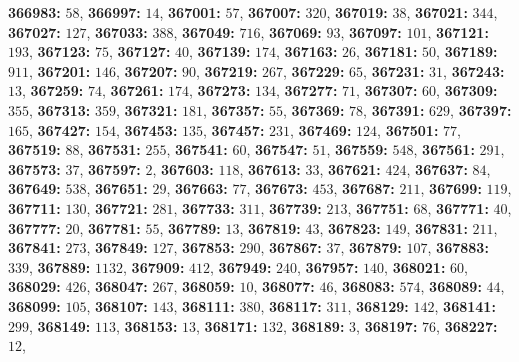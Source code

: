 \textsf{\bfseries 366983:} $58$, \textsf{\bfseries 366997:} $14$, \textsf{\bfseries 367001:} $57$, \textsf{\bfseries 367007:} $320$, \textsf{\bfseries 367019:} $38$, \textsf{\bfseries 367021:} $344$, \textsf{\bfseries 367027:} $127$, \textsf{\bfseries 367033:} $388$, \textsf{\bfseries 367049:} $716$, \textsf{\bfseries 367069:} $93$, \textsf{\bfseries 367097:} $101$, \textsf{\bfseries 367121:} $193$, \textsf{\bfseries 367123:} $75$, \textsf{\bfseries 367127:} $40$, \textsf{\bfseries 367139:} $174$, \textsf{\bfseries 367163:} $26$, \textsf{\bfseries 367181:} $50$, \textsf{\bfseries 367189:} $911$, \textsf{\bfseries 367201:} $146$, \textsf{\bfseries 367207:} $90$, \textsf{\bfseries 367219:} $267$, \textsf{\bfseries 367229:} $65$, \textsf{\bfseries 367231:} $31$, \textsf{\bfseries 367243:} $13$, \textsf{\bfseries 367259:} $74$, \textsf{\bfseries 367261:} $174$, \textsf{\bfseries 367273:} $134$, \textsf{\bfseries 367277:} $71$, \textsf{\bfseries 367307:} $60$, \textsf{\bfseries 367309:} $355$, \textsf{\bfseries 367313:} $359$, \textsf{\bfseries 367321:} $181$, \textsf{\bfseries 367357:} $55$, \textsf{\bfseries 367369:} $78$, \textsf{\bfseries 367391:} $629$, \textsf{\bfseries 367397:} $165$, \textsf{\bfseries 367427:} $154$, \textsf{\bfseries 367453:} $135$, \textsf{\bfseries 367457:} $231$, \textsf{\bfseries 367469:} $124$, \textsf{\bfseries 367501:} $77$, \textsf{\bfseries 367519:} $88$, \textsf{\bfseries 367531:} $255$, \textsf{\bfseries 367541:} $60$, \textsf{\bfseries 367547:} $51$, \textsf{\bfseries 367559:} $548$, \textsf{\bfseries 367561:} $291$, \textsf{\bfseries 367573:} $37$, \textsf{\bfseries 367597:} $2$, \textsf{\bfseries 367603:} $118$, \textsf{\bfseries 367613:} $33$, \textsf{\bfseries 367621:} $424$, \textsf{\bfseries 367637:} $84$, \textsf{\bfseries 367649:} $538$, \textsf{\bfseries 367651:} $29$, \textsf{\bfseries 367663:} $77$, \textsf{\bfseries 367673:} $453$, \textsf{\bfseries 367687:} $211$, \textsf{\bfseries 367699:} $119$, \textsf{\bfseries 367711:} $130$, \textsf{\bfseries 367721:} $281$, \textsf{\bfseries 367733:} $311$, \textsf{\bfseries 367739:} $213$, \textsf{\bfseries 367751:} $68$, \textsf{\bfseries 367771:} $40$, \textsf{\bfseries 367777:} $20$, \textsf{\bfseries 367781:} $55$, \textsf{\bfseries 367789:} $13$, \textsf{\bfseries 367819:} $43$, \textsf{\bfseries 367823:} $149$, \textsf{\bfseries 367831:} $211$, \textsf{\bfseries 367841:} $273$, \textsf{\bfseries 367849:} $127$, \textsf{\bfseries 367853:} $290$, \textsf{\bfseries 367867:} $37$, \textsf{\bfseries 367879:} $107$, \textsf{\bfseries 367883:} $339$, \textsf{\bfseries 367889:} $1132$, \textsf{\bfseries 367909:} $412$, \textsf{\bfseries 367949:} $240$, \textsf{\bfseries 367957:} $140$, \textsf{\bfseries 368021:} $60$, \textsf{\bfseries 368029:} $426$, \textsf{\bfseries 368047:} $267$, \textsf{\bfseries 368059:} $10$, \textsf{\bfseries 368077:} $46$, \textsf{\bfseries 368083:} $574$, \textsf{\bfseries 368089:} $44$, \textsf{\bfseries 368099:} $105$, \textsf{\bfseries 368107:} $143$, \textsf{\bfseries 368111:} $380$, \textsf{\bfseries 368117:} $311$, \textsf{\bfseries 368129:} $142$, \textsf{\bfseries 368141:} $299$, \textsf{\bfseries 368149:} $113$, \textsf{\bfseries 368153:} $13$, \textsf{\bfseries 368171:} $132$, \textsf{\bfseries 368189:} $3$, \textsf{\bfseries 368197:} $76$, \textsf{\bfseries 368227:} $12$, 
